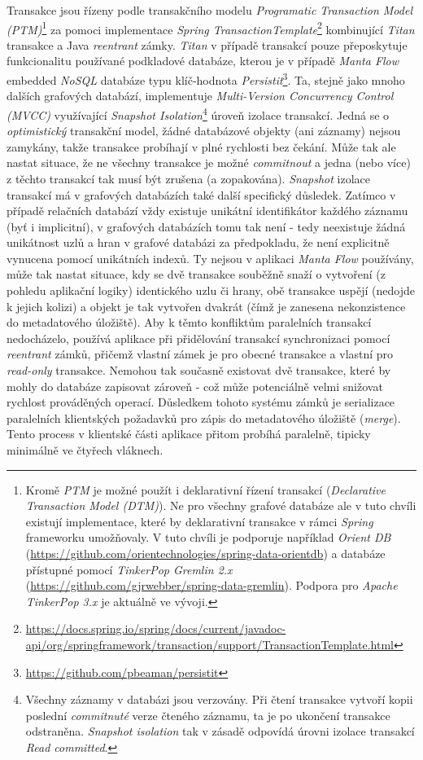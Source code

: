 Transakce jsou řízeny podle transakčního modelu \textit{Programatic Transaction Model (PTM)}\footnote{Kromě \textit{PTM} je možné použít i deklarativní řízení transakcí (\textit{Declarative Transaction Model (DTM)}). Ne pro všechny grafové databáze ale v tuto chvíli existují implementace, které by deklarativní transakce v rámci \textit{Spring} frameworku umožňovaly. V tuto chvíli je podporuje například \textit{Orient DB} (\url{https://github.com/orientechnologies/spring-data-orientdb}) a databáze přístupné pomocí \textit{TinkerPop Gremlin 2.x} (\url{https://github.com/gjrwebber/spring-data-gremlin}). Podpora pro \textit{Apache TinkerPop 3.x} je aktuálně ve vývoji.} \cite{Little04} za pomoci implementace \textit{Spring TransactionTemplate}\footnote{\url{https://docs.spring.io/spring/docs/current/javadoc-api/org/springframework/transaction/support/TransactionTemplate.html}} kombinující \textit{Titan} transakce a Java \textit{reentrant} zámky.
\textit{Titan} v případě transakcí pouze přeposkytuje funkcionalitu používané podkladové databáze, kterou je v případě \textit{Manta Flow} embedded \textit{NoSQL} databáze typu klíč-hodnota \textit{Persistit}\footnote{\url{https://github.com/pbeaman/persistit}}. Ta, stejně jako mnoho dalších grafových databází, implementuje \textit{Multi-Version Concurrency Control (MVCC)} \cite{Prakash10} využívající \textit{Snapshot Isolation}\footnote{Všechny záznamy v databázi jsou verzovány. Při čtení transakce vytvoří kopii poslední \textit{commitnuté} verze čteného záznamu, ta je po ukončení transakce odstraněna. \textit{Snapshot isolation} tak v zásadě odpovídá úrovni izolace transakcí \textit{Read committed}.} úroveň izolace transakcí.
Jedná se o \textit{optimistický} transakční model, žádné databázové objekty (ani záznamy) nejsou zamykány, takže transakce probíhají v plné rychlosti bez čekání. Může tak ale nastat situace, že ne všechny transakce je možné \textit{commitnout} a jedna (nebo více) z těchto transakcí tak musí být zrušena (a zopakována). \textit{Snapshot} izolace transakcí má v grafových databázích také další specifický důsledek. Zatímco v případě relačních databází vždy existuje unikátní identifikátor každého záznamu (byť i implicitní), v grafových databázích tomu tak není - tedy neexistuje žádná unikátnost uzlů a hran v grafové databázi za předpokladu, že není explicitně vynucena pomocí unikátních indexů. Ty nejsou v aplikaci \textit{Manta Flow} používány, může tak nastat situace, kdy se dvě transakce souběžně snaží o vytvoření (z pohledu aplikační logiky) identického uzlu či hrany, obě transakce uspějí (nedojde k jejich kolizi) a objekt je tak vytvořen dvakrát (čímž je zanesena nekonzistence do metadatového úložiště).
Aby k těmto konfliktům paralelních transakcí nedocházelo, používá aplikace při přidělování transakcí synchronizaci pomocí \textit{reentrant} zámků, přičemž vlastní zámek je pro obecné transakce a vlastní pro \textit{read-only} transakce. Nemohou tak současně existovat dvě transakce, které by mohly do databáze zapisovat zároveň - což může potenciálně velmi snižovat rychlost prováděných operací. Důsledkem tohoto systému zámků je serializace paralelních klientských požadavků pro zápis do metadatového úložiště (\textit{merge}). Tento process v klientské části aplikace přitom probíhá paralelně, tipicky minimálně ve čtyřech vláknech.

